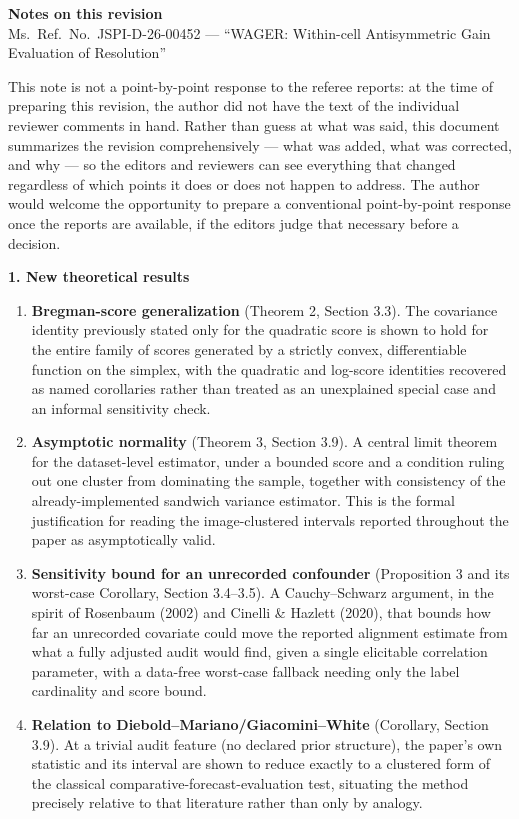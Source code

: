\documentclass[11pt,a4paper]{article}
\begin{document}
\noindent\textbf{Notes on this revision}\\
Ms.\ Ref.\ No.\ JSPI-D-26-00452 --- ``WAGER: Within-cell Antisymmetric Gain Evaluation
of Resolution''

\vspace{1em}

\noindent This note is not a point-by-point response to the referee reports: at the
time of preparing this revision, the author did not have the text of the individual
reviewer comments in hand. Rather than guess at what was said, this document
summarizes the revision comprehensively --- what was added, what was corrected, and
why --- so the editors and reviewers can see everything that changed regardless of
which points it does or does not happen to address. The author would welcome the
opportunity to prepare a conventional point-by-point response once the reports are
available, if the editors judge that necessary before a decision.

\vspace{1em}
\noindent\textbf{1. New theoretical results}

\begin{enumerate}[leftmargin=1.5em]
\item \textbf{Bregman-score generalization} (Theorem 2, Section 3.3). The covariance
identity previously stated only for the quadratic score is shown to hold for the
entire family of scores generated by a strictly convex, differentiable function on the
simplex, with the quadratic and log-score identities recovered as named corollaries
rather than treated as an unexplained special case and an informal sensitivity check.
\item \textbf{Asymptotic normality} (Theorem 3, Section 3.9). A central limit theorem
for the dataset-level estimator, under a bounded score and a condition ruling out one
cluster from dominating the sample, together with consistency of the already-implemented
sandwich variance estimator. This is the formal justification for reading the
image-clustered intervals reported throughout the paper as asymptotically valid.
\item \textbf{Sensitivity bound for an unrecorded confounder} (Proposition 3 and its
worst-case Corollary, Section 3.4--3.5). A Cauchy--Schwarz argument, in the spirit of
Rosenbaum (2002) and Cinelli \& Hazlett (2020), that bounds how far an unrecorded
covariate could move the reported alignment estimate from what a fully adjusted audit
would find, given a single elicitable correlation parameter, with a data-free
worst-case fallback needing only the label cardinality and score bound.
\item \textbf{Relation to Diebold--Mariano/Giacomini--White} (Corollary, Section 3.9).
At a trivial audit feature (no declared prior structure), the paper's own statistic and
its interval are shown to reduce exactly to a clustered form of the classical
comparative-forecast-evaluation test, situating the method precisely relative to that
literature rather than only by analogy.
\end{enumerate}
\end{document}
